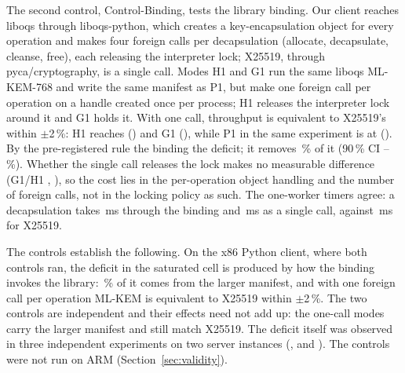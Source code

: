 \documentclass[conference]{IEEEtran}
\newcommand{\lab}[1]{\textsf{#1}}
\begin{document}
The second control, \lab{Control-Binding}, tests the library binding. Our client reaches liboqs through liboqs-python,
which creates a key-encapsulation object for every operation and makes four foreign calls per
decapsulation (allocate, decapsulate, cleanse, free), each releasing the interpreter lock;
X25519, through pyca/cryptography, is a single call. Modes H1 and G1 run the same liboqs
ML-KEM-768 and write the same manifest as P1, but make one foreign call per operation on a
handle created once per process; H1 releases the interpreter lock around it and G1 holds it.
With one call, throughput is equivalent to X25519's within $\pm$2\,\%: H1 reaches
\AudBindReleasedRatio{} (\AudBindReleasedCI) and G1 \AudBindHeldRatio{} (\AudBindHeldCI),
while P1 in the same experiment is at \AudLFullRatio{} (\AudLFullCI). By the
pre-registered rule the binding \emph{\AudBindVerdict} the deficit; it removes
\AudBindReleasedRemoved\,\% of it (90\,\% CI
\AudBindReleasedRemovedLo--\AudBindReleasedRemovedHi\,\%). Whether the single call releases the
lock makes no measurable difference (G1/H1 \AudBindHeldOverReleased, \AudBindHeldOverReleasedCI),
so the cost lies in the per-operation object handling and the number of foreign calls, not in
the locking policy as such. The one-worker timers agree: a decapsulation takes
\AudBindBindingKeOne\,ms through the binding and \AudBindReleasedKeOne\,ms as a single call,
against \AudBindEcdhKeOne\,ms for X25519.

\begin{table}[t]
\caption{Controls on 64\,KiB GET (\lab{Control-Manifest} and \lab{Control-Binding}, ten repetitions, x86 Python client): paired ratios with 90\,\% intervals. ``Padded manifest'' = X25519 with a manifest as large as ML-KEM's; ``binding'' = ML-KEM-768 through liboqs-python (mode P1); ``one call'' = the same ML-KEM-768 through a single foreign call per operation.}
\label{tab:control}
\centering\footnotesize

\end{table}

The controls establish the following. On the x86 Python client, where both controls ran, the
deficit in the saturated cell is produced by how the binding invokes the library:
\AudPadShare\,\% of it comes from the larger manifest, and with one foreign call per operation
ML-KEM is equivalent to X25519 within $\pm$2\,\%. The two controls are independent and their
effects need not add up: the one-call modes carry the larger manifest and still match X25519.
The deficit itself was observed in three independent experiments on two server instances
(\RevHotRatio, \AudJFullRatio{} and \AudLFullRatio). The controls were not run on ARM
(Section~\ref{sec:validity}).
\end{document}
